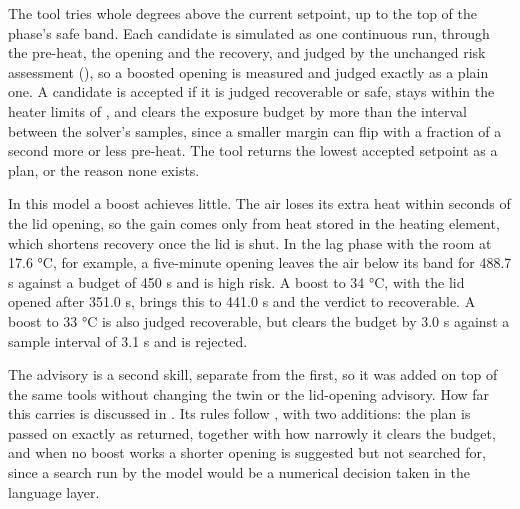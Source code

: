   The tool tries whole degrees above the current setpoint, up to the top of the phase's safe band.
  Each candidate is simulated as one continuous run, through the pre-heat, the opening and the
  recovery, and judged by the unchanged risk assessment (), so a boosted opening
  is measured and judged exactly as a plain one. A candidate is accepted if it is judged
  recoverable or safe, stays within the heater limits of , and clears the
  exposure budget by more than the interval between the solver's samples, since a smaller margin
  can flip with a fraction of a second more or less pre-heat. The tool returns the lowest accepted
  setpoint as a plan, or the reason none exists.

  In this model a boost achieves little. The air loses its extra heat within seconds of the lid
  opening, so the gain comes only from heat stored in the heating element, which shortens recovery
  once the lid is shut. In the lag phase with the room at 17.6 \si{\celsius}, for example, a
  five-minute opening leaves the air below its band for 488.7 s against a budget of 450 s and is
  high risk. A boost to 34 \si{\celsius}, with the lid opened after 351.0 s, brings this to
  441.0 s and the verdict to recoverable. A boost to 33 \si{\celsius} is also judged recoverable,
  but clears the budget by 3.0 s against a sample interval of 3.1 s and is rejected.

  The advisory is a second skill, separate from the first, so it was added on top of the same
  tools without changing the twin or the lid-opening advisory. How far this carries is discussed
  in . Its rules follow ,
  with two additions: the plan is passed on exactly as returned, together with how narrowly it
  clears the budget, and when no boost works a shorter opening is suggested but not searched for,
  since a search run by the model would be a numerical decision taken in the language layer.
